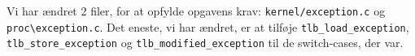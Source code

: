 Vi har ændret 2 filer, for at opfylde opgavens krav: \verb+kernel/exception.c+ og \verb+proc\exception.c+.
Det eneste, vi har ændret, er at tilføje \verb+tlb_load_exception+, \verb+tlb_store_exception+ og 
\verb+tlb_modified_exception+ til de switch-cases, der var. 